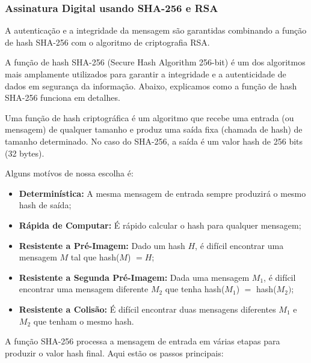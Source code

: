 \documentclass[a4paper,12pt]{article}
\begin{document}
\subsubsection*{Assinatura Digital usando SHA-256 e RSA}
A autenticação e a integridade da mensagem são garantidas combinando a função de hash SHA-256 com o algoritmo de criptografia RSA.

A função de hash SHA-256 (Secure Hash Algorithm 256-bit) é um dos algoritmos mais amplamente utilizados para garantir a integridade e a autenticidade de dados em segurança da informação. Abaixo, explicamos como a função de hash SHA-256 funciona em detalhes.

Uma função de hash criptográfica é um algoritmo que recebe uma entrada (ou mensagem) de qualquer tamanho e produz uma saída fixa (chamada de hash) de tamanho determinado. No caso do SHA-256, a saída é um valor hash de 256 bits (32 bytes).

Alguns motívos de nossa escolha é:
\begin{itemize}
    \item \textbf{Determinística:} A mesma mensagem de entrada sempre produzirá o mesmo hash de saída;
    \item \textbf{Rápida de Computar:} É rápido calcular o hash para qualquer mensagem;
    \item \textbf{Resistente a Pré-Imagem:} Dado um hash \(H\), é difícil encontrar uma mensagem \(M\) tal que hash(\(M\)) \(= H\);
    \item \textbf{Resistente a Segunda Pré-Imagem:} Dada uma mensagem \(M_{1}\), é difícil encontrar uma mensagem diferente \(M_{2}\) que tenha hash(\(M_{1}\)) \(=\) hash(\(M_{2})\);
    \item \textbf{Resistente a Colisão:} É difícil encontrar duas mensagens diferentes \(M_{1}\) e \(M_{2}\) que tenham o mesmo hash.
\end{itemize}

A função SHA-256 processa a mensagem de entrada em várias etapas para produzir o valor hash final. Aqui estão os passos principais:
\end{document}
